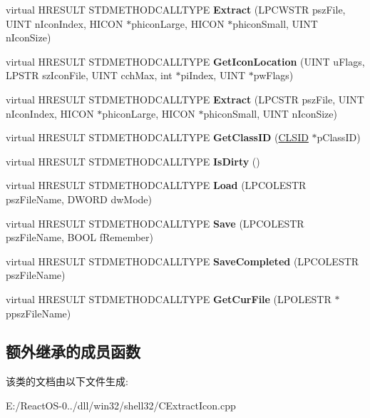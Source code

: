 \begin{DoxyCompactItemize}
virtual H\+R\+E\+S\+U\+LT S\+T\+D\+M\+E\+T\+H\+O\+D\+C\+A\+L\+L\+T\+Y\+PE {\bfseries Extract} (L\+P\+C\+W\+S\+TR psz\+File, U\+I\+NT n\+Icon\+Index, H\+I\+C\+ON $\ast$phicon\+Large, H\+I\+C\+ON $\ast$phicon\+Small, U\+I\+NT n\+Icon\+Size)
\item 
\mbox{\label{class_c_extract_icon_a3e2d4948b911960512bfd1bad9573282}} 
virtual H\+R\+E\+S\+U\+LT S\+T\+D\+M\+E\+T\+H\+O\+D\+C\+A\+L\+L\+T\+Y\+PE {\bfseries Get\+Icon\+Location} (U\+I\+NT u\+Flags, L\+P\+S\+TR sz\+Icon\+File, U\+I\+NT cch\+Max, int $\ast$pi\+Index, U\+I\+NT $\ast$pw\+Flags)
\item 
\mbox{\label{class_c_extract_icon_ab9b5f65db8ccf598d5aa50364efe9f05}} 
virtual H\+R\+E\+S\+U\+LT S\+T\+D\+M\+E\+T\+H\+O\+D\+C\+A\+L\+L\+T\+Y\+PE {\bfseries Extract} (L\+P\+C\+S\+TR psz\+File, U\+I\+NT n\+Icon\+Index, H\+I\+C\+ON $\ast$phicon\+Large, H\+I\+C\+ON $\ast$phicon\+Small, U\+I\+NT n\+Icon\+Size)
\item 
\mbox{\label{class_c_extract_icon_adc181ea1146d1dc071ecd0ba2901355c}} 
virtual H\+R\+E\+S\+U\+LT S\+T\+D\+M\+E\+T\+H\+O\+D\+C\+A\+L\+L\+T\+Y\+PE {\bfseries Get\+Class\+ID} (\hyperlink{struct___i_i_d}{C\+L\+S\+ID} $\ast$p\+Class\+ID)
\item 
\mbox{\label{class_c_extract_icon_abbef8e772e832196d7649f0a7f72cdf7}} 
virtual H\+R\+E\+S\+U\+LT S\+T\+D\+M\+E\+T\+H\+O\+D\+C\+A\+L\+L\+T\+Y\+PE {\bfseries Is\+Dirty} ()
\item 
\mbox{\label{class_c_extract_icon_aee3a0bf203e35d7677478102427f5f65}} 
virtual H\+R\+E\+S\+U\+LT S\+T\+D\+M\+E\+T\+H\+O\+D\+C\+A\+L\+L\+T\+Y\+PE {\bfseries Load} (L\+P\+C\+O\+L\+E\+S\+TR psz\+File\+Name, D\+W\+O\+RD dw\+Mode)
\item 
\mbox{\label{class_c_extract_icon_a72c1b257e4fec01e98630b24cfdbe3fd}} 
virtual H\+R\+E\+S\+U\+LT S\+T\+D\+M\+E\+T\+H\+O\+D\+C\+A\+L\+L\+T\+Y\+PE {\bfseries Save} (L\+P\+C\+O\+L\+E\+S\+TR psz\+File\+Name, B\+O\+OL f\+Remember)
\item 
\mbox{\label{class_c_extract_icon_abbbffd95eb8dc1c7cf249de9c4211e07}} 
virtual H\+R\+E\+S\+U\+LT S\+T\+D\+M\+E\+T\+H\+O\+D\+C\+A\+L\+L\+T\+Y\+PE {\bfseries Save\+Completed} (L\+P\+C\+O\+L\+E\+S\+TR psz\+File\+Name)
\item 
\mbox{\label{class_c_extract_icon_a9f6ea4efa9a34bd5d529fafb211766d2}} 
virtual H\+R\+E\+S\+U\+LT S\+T\+D\+M\+E\+T\+H\+O\+D\+C\+A\+L\+L\+T\+Y\+PE {\bfseries Get\+Cur\+File} (L\+P\+O\+L\+E\+S\+TR $\ast$ppsz\+File\+Name)
\end{DoxyCompactItemize}
\subsection*{额外继承的成员函数}


该类的文档由以下文件生成\+:\begin{DoxyCompactItemize}
\item 
E\+:/\+React\+O\+S-\/0../dll/win32/shell32/C\+Extract\+Icon.\+cpp\end{DoxyCompactItemize}

